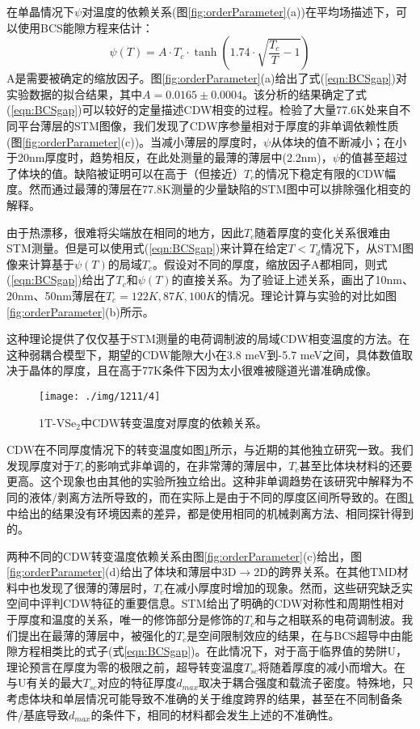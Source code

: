 \documentclass[reprint, aps, prb, showkeys]{revtex4-2}
\begin{document}
在单晶情况下$\psi$对温度的依赖关系(图\ref{fig:orderParameter}(a))在平均场描述下，可以使用BCS能隙方程来估计：
\begin{equation}
    \psi(T) = A \cdot T_c \cdot \tanh \left( 1.74 \cdot \sqrt{\frac{T_c}{T} - 1} \right)
    \label{eqn:BCSgap}
\end{equation}
A是需要被确定的缩放因子。图\ref{fig:orderParameter}(a)给出了式(\ref{eqn:BCSgap})对实验数据的拟合结果，其中$A = 0.0165 \pm 0.0004$。该分析的结果确定了式(\ref{eqn:BCSgap})可以较好的定量描述CDW相变的过程。检验了大量77.6K处来自不同平台薄层的STM图像，我们发现了CDW序参量相对于厚度的非单调依赖性质(图\ref{fig:orderParameter}(c))。当减小薄层的厚度时，$\psi$从体块的值不断减小；在小于20nm厚度时，趋势相反，在此处测量的最薄的薄层中(2.2nm)，$\psi$的值甚至超过了体块的值。缺陷被证明可以在高于（但接近）$T_c$的情况下稳定有限的CDW幅度。然而通过最薄的薄层在77.8K测量的少量缺陷的STM图中可以排除强化相变的解释。

由于热漂移，很难将尖端放在相同的地方，因此$T_c$随着厚度的变化关系很难由STM测量。但是可以使用式(\ref{eqn:BCSgap})来计算在给定$T < T_d$情况下，从STM图像来计算基于$\psi(T)$的局域$T_c$。假设对不同的厚度，缩放因子A都相同，则式(\ref{eqn:BCSgap})给出了$T_c$和$\psi(T)$的直接关系。为了验证上述关系，画出了10nm、20nm、50nm薄层在$T_c = 122K, 87K, 100K$的情况。理论计算与实验的对比如图\ref{fig:orderParameter}(b)所示。

这种理论提供了仅仅基于STM测量的电荷调制波的局域CDW相变温度的方法。在这种弱耦合模型下，期望的CDW能隙大小在3.8 meV到-5.7 meV之间，具体数值取决于晶体的厚度，且在高于77K条件下因为太小很难被隧道光谱准确成像。
\begin{figure}[b]
    \texttt{[image: ./img/1211/4]}
    \caption{\label{fig:thicknessDependence} 
    1T-VSe$_2$中CDW转变温度对厚度的依赖关系。
    }
\end{figure}

CDW在不同厚度情况下的转变温度如图\ref{fig:thicknessDependence}所示，与近期的其他独立研究一致。我们发现厚度对于$T_c$的影响式非单调的，在非常薄的薄层中，$T_c$甚至比体块材料的还要更高。这个现象也由其他的实验所独立给出。这种非单调趋势在该研究中解释为不同的液体/剥离方法所导致的，而在实际上是由于不同的厚度区间所导致的。在图\ref{fig:thicknessDependence}中给出的结果没有环境因素的差异，都是使用相同的机械剥离方法、相同探针得到的。

两种不同的CDW转变温度依赖关系由图\ref{fig:orderParameter}(c)给出，图\ref{fig:orderParameter}(d)给出了体块和薄层中3D$\rightarrow$2D的跨界关系。在其他TMD材料中也发现了很薄的薄层时，$T_c$在减小厚度时增加的现象。然而，这些研究缺乏实空间中评判CDW特征的重要信息。STM给出了明确的CDW对称性和周期性相对于厚度和温度的关系，唯一的修饰部分是修饰的$T_c$和与之相联系的电荷调制波。我们提出在最薄的薄层中，被强化的$T_c$是空间限制效应的结果，在与BCS超导中由能隙方程相类比的式子(式\ref{eqn:BCSgap})。在此情况下，对于高于临界值的势阱U，理论预言在厚度为零的极限之前，超导转变温度$T_{sc}$将随着厚度的减小而增大。在与U有关的最大$T_{sc}$对应的特征厚度$d_{max}$取决于耦合强度和载流子密度。特殊地，只考虑体块和单层情况可能导致不准确的关于维度跨界的结果，甚至在不同制备条件/基底导致$d_{max}$的条件下，相同的材料都会发生上述的不准确性。
\end{document}
